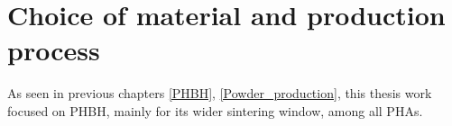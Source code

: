 \documentclass{article}
\begin{document}
%
%
%
%
%



    \clearpage
    \section{Choice of material and production process\label{Choice_material_process}}

    As seen in previous chapters \ref{PHBH}, \ref{Powder_production}, this thesis work focused on PHBH, mainly for its wider sintering window, among all PHAs. \\ 
\end{document}

